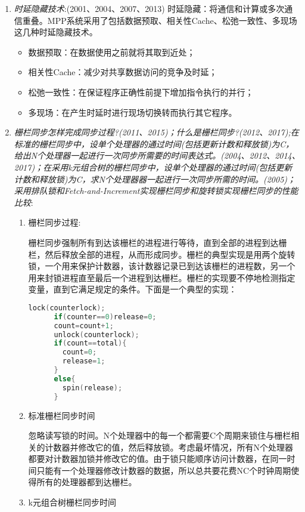 \documentclass[a4paper]{ctexbook}
\begin{document}
\begin{enumerate}
  \item \emph{时延隐藏技术}:(2001、2004、2007、2013)
  时延隐藏：将通信和计算或多次通信重叠。MPP系统采用了包括数据预取、相关性Cache、松弛一致性、多现场这几种时延隐藏技术。
  \begin{itemize}
    \item 数据预取：在数据使用之前就将其取到近处；
    \item 相关性Cache：减少对共享数据访问的竞争及时延；
    \item 松弛一致性：在保证程序正确性前提下增加指令执行的并行；
    \item 多现场：在产生时延时进行现场切换转而执行其它程序。
  \end{itemize}
  
  \item \emph{栅栏同步怎样完成同步过程?(2011、2015)；什么是栅栏同步?(2012、2017);在标准的栅栏同步中，设单个处理器的通过时间(包括更新计数和释放锁)为C，给出N个处理器一起进行一次同步所需要的时间表达式。(2004、2012、2014、2017)；在采用k元组合树的栅栏同步中，设单个处理器的通过时间(包括更新计数和释放锁)为C，求N个处理器器一起进行一次同步所需的时间。(2005)；采用排队锁和Fetch-and-Increment实现栅栏同步和旋转锁实现栅栏同步的性能比较}:
  \begin{enumerate}
    \item 栅栏同步过程:
    
    栅栏同步强制所有到达该栅栏的进程进行等待，直到全部的进程到达栅栏，然后释放全部的进程，从而形成同步。栅栏的典型实现是用两个旋转锁，一个用来保护计数器，该计数器记录已到达该栅栏的进程数，另一个用来封锁进程直至最后一个进程到达栅栏。栅栏的实现要不停地检测指定变量，直到它满足规定的条件。下面是一个典型的实现：
    \begin {lstlisting}[language=C] 
      lock(counterlock);
      if(counter==0)release=0;
      count=count+1;
      unlock(counterlock);
      if(count==total){
        count=0;
        release=1;
      }
      else{
        spin(release);
      }
    \end{lstlisting}
    
    \item 标准栅栏同步时间
    
    忽略读写锁的时间。N个处理器中的每一个都需要C个周期来锁住与栅栏相关的计数器并修改它的值，然后释放锁。考虑最坏情况，所有N个处理器都要对计数器加锁并修改它的值。由于锁只能顺序访问计数器，在同一时间只能有一个处理器修改计数器的数据，所以总共要花费NC个时钟周期使得所有的处理器都到达栅栏。
    
    \item k元组合树栅栏同步时间
    

\end{enumerate}
\end{enumerate}
\end{document}
